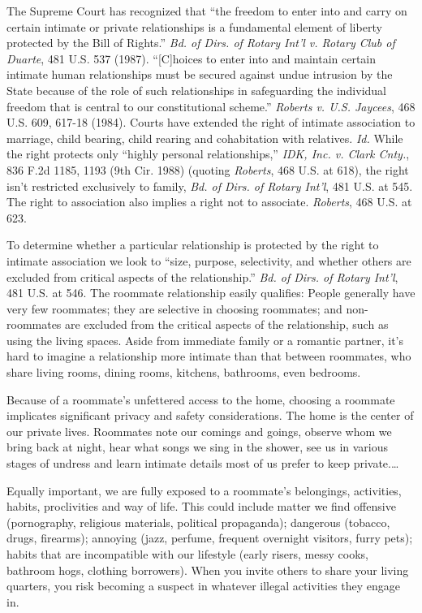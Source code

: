The Supreme Court has recognized that ``the freedom to enter into and carry on
certain intimate or private relationships is a fundamental element of liberty
protected by the Bill of Rights.'' \textit{Bd. of Dirs. of Rotary Int'l v.
Rotary Club of Duarte}, 481 U.S. 537 (1987). ``[C]hoices to enter into and
maintain certain intimate human relationships must be secured against undue
intrusion by the State because of the role of such relationships in
safeguarding the individual freedom that is central to our constitutional
scheme.'' \textit{Roberts v. U.S. Jaycees}, 468 U.S. 609, 617-18 (1984). Courts
have extended the right of intimate association to marriage, child bearing,
child rearing and cohabitation with relatives. \textit{Id.} While the right
protects only ``highly personal relationships,'' \textit{IDK, Inc. v. Clark
Cnty.}, 836 F.2d 1185, 1193 (9th Cir. 1988) (quoting \textit{Roberts}, 468 U.S.
at 618), the right isn't restricted exclusively to family, \textit{Bd. of Dirs.
of Rotary Int'l}, 481 U.S. at 545. The right to association also implies a
right not to associate. \textit{Roberts}, 468 U.S. at 623.  

To determine whether a particular relationship is protected by the right to
intimate association we look to ``size, purpose, selectivity, and whether
others are excluded from critical aspects of the relationship.'' \textit{Bd. of
Dirs. of Rotary Int'l}, 481 U.S. at 546. The roommate relationship easily
qualifies: People generally have very few roommates; they are selective in
choosing roommates; and non-roommates are excluded from the critical aspects of
the relationship, such as using the living spaces. Aside from immediate family
or a romantic partner, it's hard to imagine a relationship more intimate than
that between roommates, who share living rooms, dining rooms, kitchens,
bathrooms, even bedrooms.

Because of a roommate's unfettered access to the home, choosing a roommate
implicates significant privacy and safety considerations. The home is the
center of our private lives. Roommates note our comings and goings, observe
whom we bring back at night, hear what songs we sing in the shower, see us in
various stages of undress and learn intimate details most of us prefer to keep
private.\ldots

Equally important, we are fully exposed to a roommate's belongings, activities,
habits, proclivities and way of life. This could include matter we find
offensive (pornography, religious materials, political propaganda); dangerous
(tobacco, drugs, firearms); annoying (jazz, perfume, frequent overnight
visitors, furry pets); habits that are incompatible with our lifestyle (early
risers, messy cooks, bathroom hogs, clothing borrowers). When you invite others
to share your living quarters, you risk becoming a suspect in whatever illegal
activities they engage in.


